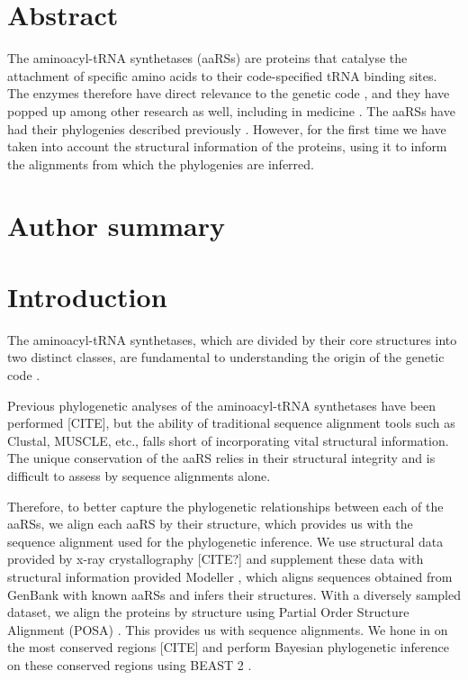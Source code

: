 \documentclass[10pt,letterpaper]{article}
\begin{document}
\section*{Abstract}
The aminoacyl-tRNA synthetases (aaRSs) are proteins that catalyse the attachment of specific amino acids to their code-specified tRNA binding sites.  The enzymes therefore have direct relevance to the genetic code \cite{bib10}, and they have popped up 
among other research as well, including in medicine \cite{bib9}.
The aaRSs have had their phylogenies described previously \cite{}.  However, for the first time we have taken into account the structural information of the proteins, using it to inform the alignments from which the phylogenies are inferred.

\section*{Author summary}

\linenumbers

\section*{Introduction}
The aminoacyl-tRNA synthetases, which are divided by their core structures into two distinct classes, are fundamental to understanding the origin of the genetic code \cite{bib10}.

Previous phylogenetic analyses of the aminoacyl-tRNA synthetases have been performed [CITE], but the ability of traditional sequence alignment tools such as Clustal, MUSCLE, etc., falls short of 
incorporating vital structural information.  The unique conservation of the aaRS relies in their structural integrity and is difficult to assess by sequence alignments alone.  

Therefore, to better capture the phylogenetic relationships between each of the aaRSs, we align each aaRS by their structure, which provides us with the sequence alignment used for the phylogenetic inference.  
We use structural data provided by x-ray crystallography [CITE?] and supplement these data with structural information provided Modeller \cite{Modeller}, which aligns sequences obtained from GenBank with known aaRSs and infers their structures.
With a diversely sampled dataset, we align the proteins by structure using Partial Order Structure Alignment (POSA) \cite{bib6}.  This provides us with sequence alignments.  We hone in on the most conserved regions [CITE] and perform 
Bayesian phylogenetic inference on these conserved regions using BEAST 2 \cite{bib7}.
\end{document}
